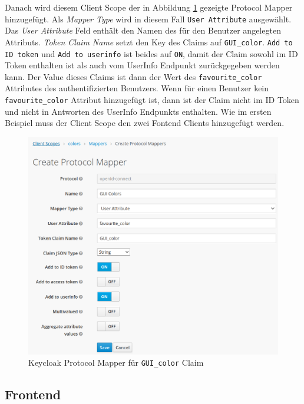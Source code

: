 Danach wird diesem Client Scope der in Abbildung \ref{fig:EB_Keycloak Protocol Mapper fuer GUI color Claim} gezeigte Protocol Mapper hinzugefügt. Als \textit{Mapper Type} wird in diesem Fall \texttt{User Attribute} ausgewählt. Das \textit{User Attribute} Feld enthält den Namen des für den Benutzer angelegten Attributs. \textit{Token Claim Name} setzt den Key des Claims auf \texttt{GUI\_color}. \texttt{Add to ID token} und \texttt{Add to userinfo} ist beides auf \texttt{ON}, damit der Claim sowohl im ID Token enthalten ist als auch vom UserInfo Endpunkt zurückgegeben werden kann. Der Value dieses Claims ist dann der Wert des \texttt{favourite\_color} Attributes des authentifizierten Benutzers. Wenn für einen Benutzer kein \texttt{favourite\_color} Attribut hinzugefügt ist, dann ist der Claim nicht im ID Token und nicht in Antworten des UserInfo Endpunkts enthalten. Wie im ersten Beispiel muss der Client Scope den zwei Fontend Clients hinzugefügt werden.

\begin{figure}[!ht]
	\centering
	\includegraphics[width=1\textwidth]{Images/Ebert/KeycloakNewClaimProtocolMapper.PNG}
	\caption{Keycloak Protocol Mapper für \texttt{GUI\_color} Claim}
	\label{fig:EB_Keycloak Protocol Mapper fuer GUI color Claim}
\end{figure}



\subsection{Frontend}

